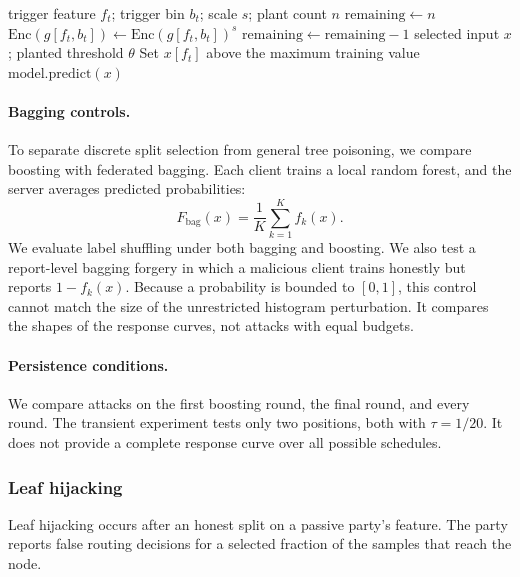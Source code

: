 \documentclass[11pt]{article}
\begin{document}
\begin{algorithm}[htbp]
\caption{Label-inference-free backdoor through split hijacking}
\label{alg:backdoor}
\begin{algorithmic}[1]
\Require trigger feature $f_t$; trigger bin $b_t$; scale $s$; plant count $n$
\State $\mathrm{remaining}\gets n$
    \State $\mathrm{Enc}(g[f_t,b_t])\gets\mathrm{Enc}(g[f_t,b_t])^s$
    \State $\mathrm{remaining}\gets\mathrm{remaining}-1$
  \EndIf
\EndFor
\Statex
\Require selected input $x$; planted threshold $\theta$
  \State Set $x[f_t]$ above the maximum training value
\EndIf
\State \Return $\mathrm{model.predict}(x)$
\end{algorithmic}
\end{algorithm}

\paragraph{Bagging controls.}
To separate discrete split selection from general tree poisoning, we compare boosting with federated bagging. Each client trains a local random forest, and the server averages predicted probabilities:
\[
F_{\mathrm{bag}}(x)=\frac{1}{K}\sum_{k=1}^K f_k(x).
\]
We evaluate label shuffling under both bagging and boosting. We also test a report-level bagging forgery in which a malicious client trains honestly but reports $1-f_k(x)$. Because a probability is bounded to $[0,1]$, this control cannot match the size of the unrestricted histogram perturbation. It compares the shapes of the response curves, not attacks with equal budgets.

\paragraph{Persistence conditions.}
We compare attacks on the first boosting round, the final round, and every round. The transient experiment tests only two positions, both with $\tau=1/20$. It does not provide a complete response curve over all possible schedules.

\subsubsection{Leaf hijacking}
\label{sec:leafhijack}

Leaf hijacking occurs after an honest split on a passive party's feature. The party reports false routing decisions for a selected fraction of the samples that reach the node.
\end{document}
